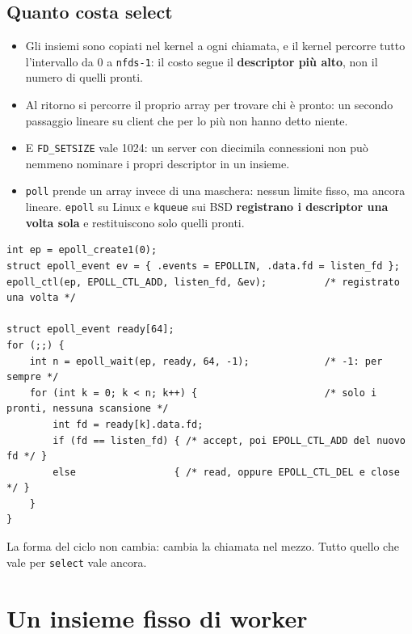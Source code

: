 \subsection{Quanto costa select}

\begin{itemize}
    \item Gli insiemi sono copiati nel kernel a ogni chiamata, e il kernel percorre tutto l'intervallo da 0 a
          \texttt{nfds-1}: il costo segue il \textbf{descriptor più alto}, non il numero di quelli pronti.
    \item Al ritorno si percorre il proprio array per trovare chi è pronto: un secondo passaggio lineare su client che per lo
          più non hanno detto niente.
    \item E \texttt{FD\_SETSIZE} vale 1024: un server con diecimila connessioni non può nemmeno nominare i propri descriptor
          in un insieme.
    \item \texttt{poll} prende un array invece di una maschera: nessun limite fisso, ma ancora lineare. \texttt{epoll} su
          Linux e \texttt{kqueue} sui BSD \textbf{registrano i descriptor una volta sola} e restituiscono solo quelli
          pronti.
\end{itemize}

\begin{lstlisting}[language={[POSIX]C}, style=wnumbers, title={Lo stesso ciclo con epoll}]
int ep = epoll_create1(0);
struct epoll_event ev = { .events = EPOLLIN, .data.fd = listen_fd };
epoll_ctl(ep, EPOLL_CTL_ADD, listen_fd, &ev);          /* registrato una volta */

struct epoll_event ready[64];
for (;;) {
    int n = epoll_wait(ep, ready, 64, -1);             /* -1: per sempre */
    for (int k = 0; k < n; k++) {                      /* solo i pronti, nessuna scansione */
        int fd = ready[k].data.fd;
        if (fd == listen_fd) { /* accept, poi EPOLL_CTL_ADD del nuovo fd */ }
        else                 { /* read, oppure EPOLL_CTL_DEL e close */ }
    }
}
\end{lstlisting}

La forma del ciclo non cambia: cambia la chiamata nel mezzo. Tutto quello che vale per \texttt{select} vale ancora.

\section{Un insieme fisso di worker}

